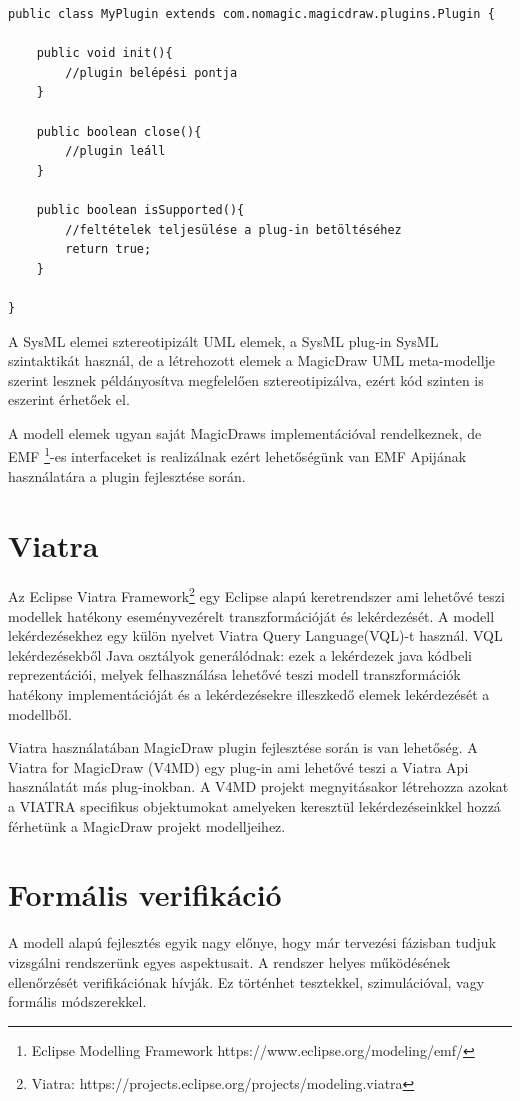\lstset{style=javacode}
\begin{lstlisting}
public class MyPlugin extends com.nomagic.magicdraw.plugins.Plugin {

	public void init(){
		//plugin belépési pontja
	}
	
	public boolean close(){
		//plugin leáll
	}
	
	public boolean isSupported(){
		//feltételek teljesülése a plug-in betöltéséhez
		return true;
	}
	
}
\end{lstlisting}

A SysML elemei sztereotipizált UML elemek, a SysML plug-in SysML szintaktikát használ, de a létrehozott elemek a MagicDraw UML meta-modellje szerint lesznek példányosítva megfelelően sztereotipizálva, ezért kód szinten is eszerint érhetőek el.

A modell elemek ugyan saját MagicDraws implementációval rendelkeznek, de EMF \footnote{Eclipse Modelling Framework https://www.eclipse.org/modeling/emf/}-es interfaceket is realizálnak ezért lehetőségünk van EMF Apijának használatára a plugin fejlesztése során.

\section{Viatra}

Az Eclipse Viatra Framework\footnote{Viatra: https://projects.eclipse.org/projects/modeling.viatra} egy Eclipse alapú keretrendszer ami lehetővé teszi modellek hatékony eseményvezérelt transzformációját és lekérdezését. A modell lekérdezésekhez egy külön nyelvet Viatra Query Language(VQL)-t használ. VQL lekérdezésekből Java osztályok generálódnak: ezek a lekérdezek java kódbeli reprezentációi, melyek felhasználása lehetővé teszi modell transzformációk hatékony implementációját és a lekérdezésekre illeszkedő elemek lekérdezését a modellből.

Viatra használatában MagicDraw plugin fejlesztése során is van lehetőség. A Viatra for MagicDraw (V4MD) egy plug-in ami lehetővé teszi a Viatra Api használatát más plug-inokban. A V4MD projekt megnyitásakor létrehozza azokat a VIATRA specifikus objektumokat amelyeken keresztül lekérdezéseinkkel hozzá férhetünk a MagicDraw projekt modelljeihez.

\section{Formális verifikáció}
\label{sec:formal-verif}
A modell alapú fejlesztés egyik nagy előnye, hogy már tervezési fázisban tudjuk vizsgálni rendszerünk egyes aspektusait. A rendszer helyes működésének ellenőrzését verifikációnak hívják. Ez történhet tesztekkel, szimulációval, vagy formális módszerekkel.

